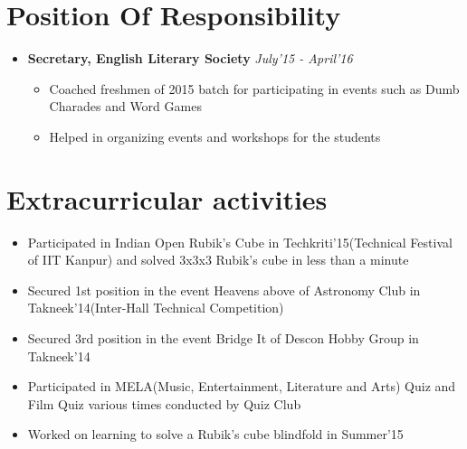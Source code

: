 \documentclass[11pt,a4paper]{article}
\begin{document}
\section*{Position Of Responsibility}
\vspace{-0.1cm}
\begin{itemize}
\item \textbf{Secretary, English Literary Society}   \hfill\textit{ July'15 - April'16}
\begin{itemize}
\item Coached freshmen of 2015 batch for participating in events such as Dumb Charades and Word Games
\item Helped in organizing events and workshops for the students
\end{itemize}
\end{itemize}

\vspace{-0.4cm}
\section*{Extracurricular activities}
\begin{itemize}
\item Participated in Indian Open Rubik’s Cube in Techkriti'15(Technical Festival of IIT Kanpur) and solved 3x3x3
Rubik’s cube in less than a minute
\item Secured 1st position in the event Heavens above of Astronomy Club in Takneek'14(Inter-Hall Technical
Competition)
\item Secured 3rd position in the event Bridge It of Descon Hobby Group in Takneek'14
\item Participated in MELA(Music, Entertainment, Literature and Arts) Quiz and Film Quiz various times conducted
by Quiz Club
\item Worked on learning to solve a Rubik’s cube blindfold in Summer'15
\end{itemize}
\end{document}
